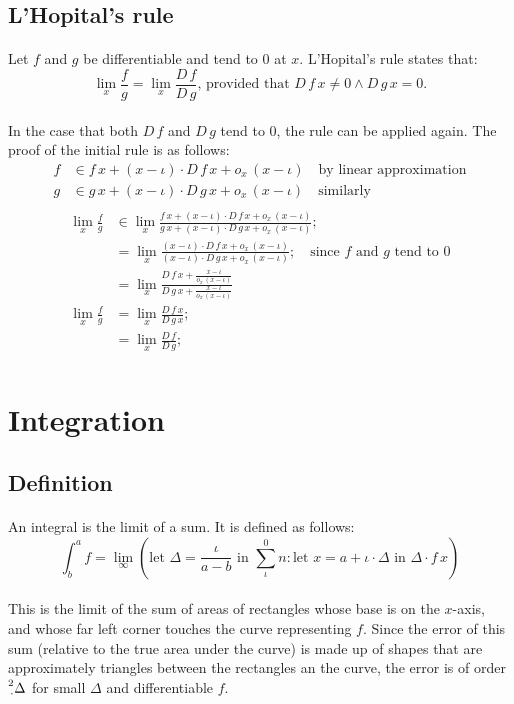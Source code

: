 \documentclass[11pt]{article}
\newcommand*\id{\iota}
\newcommand*\cd{\cdot}
\newcommand*\prg{\paragraph}
\newcommand*\pt{\prescript}
\begin{document}
\subsection{L'Hopital's rule}
\prg{}Let $f$ and $g$ be differentiable and tend to $0$ at $x$. L'Hopital's rule states that:
\[
\lim_x\frac f g=\lim_x\frac{D\,f}{D\,g}\textrm{, provided that }D\,f\,x\neq 0\wedge D\,g\,x=0\textrm{.}
\]
\prg{}In the case that both $D\,f$ and $D\,g$ tend to $0$, the rule can be applied again. The proof of the initial rule is as follows:
\[
\begin{aligned}
f&\in f\,x+(x-\id)\cd D\,f\,x+o_x\,(x-\id) \quad\textrm{by linear approximation} \\
g&\in g\,x+(x-\id)\cd D\,g\,x+o_x\,(x-\id) \quad\textrm{similarly} \\
\end{aligned}
\]
\[
\begin{aligned}
\lim_x\frac f g&\in\lim_x\frac{f\,x+(x-\id)\cd D\,f\,x+o_x\,(x-\id)}{g\,x+(x-\id)\cd D\,g\,x+o_x\,(x-\id)}; \\
&=\lim_x\frac{(x-\id)\cd D\,f\,x+o_x\,(x-\id)}{(x-\id)\cd D\,g\,x+o_x\,(x-\id)}; \quad\textrm{since $f$ and $g$ tend to $0$}\\
&=\lim_x\frac{D\,f\,x+\frac{x-\id}{o_x\,(x-\id)}}{D\,g\,x+\frac{x-\id}{o_x\,(x-\id)}} \\
\lim_x\frac f g&=\lim_x\frac{D\,f\,x}{D\,g\,x}; \\
&=\lim_x\frac{D\,f}{D\,g}; \\
\end{aligned}
\]

\section{Integration}
\subsection{Definition}
\prg{}An integral is the limit of a sum. It is defined as follows:
\[
\int^a_b f=\lim_\infty\left(\textrm{let }\Delta=\frac{\id}{a-b}\textrm{ in }\sum^0_\id n:\textrm{let }x=a+\id\cd\Delta\textrm{ in }\Delta\cd f\,x\right)
\]
\prg{}This is the limit of the sum of areas of rectangles whose base is on the $x$-axis, and whose far left corner touches the curve representing $f$. Since the error of this sum (relative to the true area under the curve) is made up of shapes that are approximately triangles between the rectangles an the curve, the error is of order $\pt 2\cd\Delta$ for small $\Delta$ and differentiable $f$.
\end{document}
